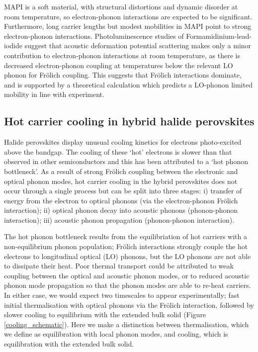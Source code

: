 MAPI is a soft material, with structural distortions and dynamic disorder at room temperature, so electron-phonon interactions are expected to be significant.
Furthermore, long carrier lengths but modest mobilities in MAPI point to strong electron-phonon interactions.\autocite{Brenner2015} 
Photoluminescence studies of Formamidinium-lead-iodide suggest that acoustic deformation potential scattering makes only a minor contribution to electron-phonon interactions at room temperature,\autocite{Wright2016}
as there is decreased electron-phonon coupling at temperatures below the relevant LO phonon for Fr\"{o}lich coupling. This suggests that Fr\"{o}lich interactions dominate, and is supported by a theoretical calculation which predicts a LO-phonon limited mobility in line with experiment.\autocite{Frost2017b}

\subsection{Hot carrier cooling in hybrid halide perovskites}

Halide perovskites display unusual cooling kinetics for electrons photo-excited above the bandgap.
The cooling of these `hot' electrons is slower than that observed in other semiconductors and this has been attributed to a `hot phonon bottleneck'.\autocite{Yang2016e,Yang2017a} %
As a result of strong Fr\"{o}lich coupling between the electronic and optical phonon modes, hot carrier cooling in the hybrid perovskites does not occur through a single process but can be split into three stages: i) transfer of energy from the electron to optical phonons (via the electron-phonon Fr\"{o}lich interaction); ii) optical phonon decay into acoustic phonons (phonon-phonon interaction); iii) acoustic phonon propagation (phonon-phonon interaction).

The hot phonon bottleneck results from the equilibriation of hot carriers with a non-equilibrium phonon population;
Fr\"{o}lich interactions strongly couple the hot electrons to longitudinal optical (LO) phonons, but the LO phonons are not able to dissipate their heat. 
Poor thermal transport could be attributed to weak coupling between the optical and acoustic phonon modes, or to reduced acoustic phonon mode propagation so that the phonon modes are able to re-heat carriers.
In either case, we would expect two timescales to appear experimentally; fast initial thermalisation with optical phonons via the Fr\"{o}lich interaction, followed by slower cooling to equilibrium with the extended bulk solid (Figure \ref{cooling_schematic}). Here we make a distinction between thermalisation, which we define as equilibration with local phonon modes, and cooling, which is equilibration with the extended bulk solid.

